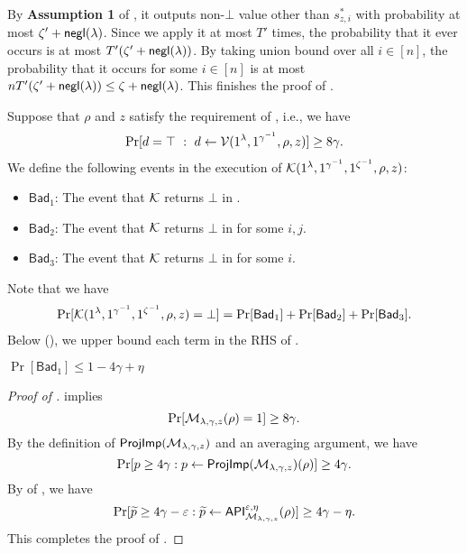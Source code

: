 
By {\bf Assumption 1} of , it outputs non-$\bot$ value other than $s^*_{z,i}$ with probability at most $\zeta'+\mathsf{negl}(\lambda)$. 
Since we apply it at most $T'$ times, the probability that it ever occurs is at most $T' (\zeta'+\mathsf{negl}(\lambda))$. %
By taking union bound over all $i\in [n]$, the probability that it occurs for some $i\in [n]$ is at most $n T' (\zeta'+\mathsf{negl}(\lambda))\le \zeta+\mathsf{negl}(\lambda)$. This finishes the proof of . 

Suppose that $\rho$ and $z$ satisfy the requirement of , i.e., we have
\begin{align}\label{eq:_assumption_V}
\Pr[d=\top ~:~ d \leftarrow \mathcal{V}(1^\lambda,1^{\gamma^{-1}},\rho,{z})]\geq  8\gamma. 
\end{align}  
We define the following events in the execution of $\mathcal{K}(1^\lambda,1^{\gamma^{-1}},1^{\zeta^{-1}},\rho,z)$: 
\begin{itemize}
\item $\mathsf{Bad}_1$: The event that $\mathcal{K}$ returns $\bot$ in   .
\item $\mathsf{Bad}_2$: The event that $\mathcal{K}$ returns $\bot$ in  for some $i,j$.    
\item $\mathsf{Bad}_3$: The event that $\mathcal{K}$ returns $\bot$ in   for some $i$.  
\end{itemize}  
Note that we have 
\begin{align}\label{eq:bot_prob}
\Pr[\mathcal{K}(1^\lambda,1^{\gamma^{-1}},1^{\zeta^{-1}},\rho,z)=\bot]=\Pr[\mathsf{Bad}_1]+\Pr[\mathsf{Bad}_2]+\Pr[\mathsf{Bad}_3].
\end{align}
Below (), we upper bound each term in the RHS of .

\begin{lemma}\label{lem:bad_1}
$\Pr[\mathsf{Bad}_1]\le 1-4\gamma+\eta$
\end{lemma}
\begin{proof}[Proof of ]
 implies
$$
\Pr[\mathcal{M}_{\lambda,\gamma,z}(\rho)=1]\geq 8\gamma. 
$$
By the definition of $\mathsf{ProjImp}(\mathcal{M}_{\lambda,\gamma,z})$ and an averaging argument, we have 
$$
\Pr[p\ge 4\gamma :p\gets \mathsf{ProjImp}(\mathcal{M}_{\lambda,\gamma,z})(\rho)]\ge 4\gamma.
$$
By  of , we have 
$$
\Pr[\widetilde{p}\ge 4\gamma- \varepsilon :\widetilde{p}\gets \mathsf{API}_{\mathcal{M}_{\lambda,\gamma,z}}^{\varepsilon,\eta}(\rho)]\ge 4\gamma-\eta.
$$
This completes the proof of .

\end{proof}

